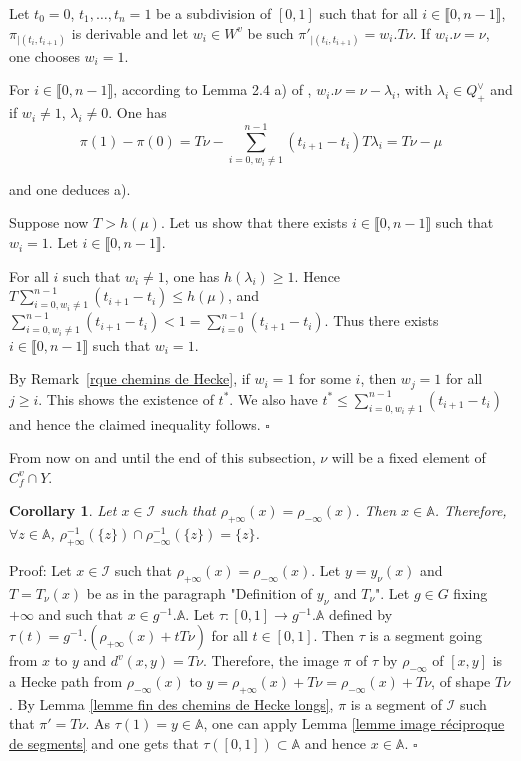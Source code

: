 \documentclass[12pt]{article}
\theoremstyle{plain}
\newtheorem{cor}[thm]{Corollary}
\theoremstyle{definition}
\newcommand{\A}{\mathbb{A}}
\begin{document}
Let $t_0=0$, $t_1, \ldots,t_n=1$ be a subdivision of $[0,1]$ such that for all $i\in \llbracket 0,n-1\rrbracket $, $\pi_{|(t_i,t_{i+1})}$ is derivable and let $w_i\in W^v$ be such $\pi'_{|(t_i,t_{i+1})}=w_i.T\nu$. If $w_i.\nu=\nu$, one chooses $w_i=1$.

For $i\in \llbracket 0,n-1\rrbracket$, according to Lemma 2.4 a) of \cite{gaussent2008kac}, $w_i.\nu =\nu -\lambda_i$, with $\lambda_i \in Q^\vee_+$ and if $w_i\neq 1$, $\lambda_i\neq 0$. One has \[\pi(1)-\pi(0)=T\nu-\sum_{i=0, w_i\neq 1}^{n-1}(t_{i+1}-t_i)T\lambda_i=T\nu -\mu\]

and one deduces a).


Suppose now $T>h(\mu)$. Let us show that there exists $i\in \llbracket 0,n-1\rrbracket$ such that $w_i=1$. Let $i\in \llbracket 0,n-1\rrbracket$. 

For all $i$ such that $w_i\neq 1$, one has $h(\lambda_i)\geq 1$. Hence $T\sum_{i=0, w_i\neq 1}^{n-1}(t_{i+1}-t_i)\leq h(\mu)$, and $\sum_{i=0, w_i\neq 1}^{n-1}(t_{i+1}-t_i)<1=\sum_{i=0}^{n-1}(t_{i+1}-t_i)$. Thus there exists $i\in \llbracket 0,n-1\rrbracket$ such that $w_i=1$.

By Remark~\ref{rque chemins de Hecke}, if $w_i=1$ for some $i$, then $w_j=1$ for all $j\geq i$. This shows the existence of $t^*$. We also have $t^*\leq \sum_{i=0, w_i\neq 1}^{n-1}(t_{i+1}-t_i)$ and hence the claimed inequality follows. $\square$




\vspace{3mm}

From now on and until the end of this subsection, $\nu$ will be a fixed element of $C_f^v\cap Y$.

\begin{cor}\label{cor points ayant meme image par les rétractions}
 Let $x\in\mathcal{I}$ such that $\rho_{+\infty}(x)=\rho_{-\infty}(x)$. Then $x\in \mathbb{A}$. Therefore, $\forall z\in \mathbb{A}$, $\rho_{+\infty}^{-1}(\{z\})\cap\rho_{-\infty}^{-1}(\{z\})=\{z\}$.
\end{cor}


Proof:  Let $x\in\mathcal{I}$ such that $\rho_{+\infty}(x)=\rho_{-\infty}(x)$. Let $y=y_\nu(x)$ and $T=T_\nu(x)$ be as in the paragraph "Definition of $y_\nu$ and $T_\nu$". Let $g\in G$ fixing $+\infty$ and such that $x\in g^{-1}.\A$. Let $\tau:[0,1]\rightarrow g^{-1}.\A$ defined by $\tau(t)=g^{-1}.(\rho_{+\infty}(x)+tT\nu)$ for all $t\in [0,1]$. Then $\tau$ is a segment going from $x$ to $y$ and $d^v(x,y)=T\nu$. Therefore, the image $\pi$ of $\tau$ by $\rho_{-\infty}$ of $[x,y]$ is a Hecke path from $\rho_{-\infty}(x)$ to $y=\rho_{+\infty}(x)+T\nu=\rho_{-\infty}(x)+T\nu$, of shape $T\nu$. By Lemma \ref{lemme fin des chemins de Hecke longs}, $\pi$ is a segment of $\mathcal{I}$ such that $\pi'=T\nu$. As $\tau(1)=y\in \A$, one can apply Lemma \ref{lemme image réciproque de segments} and one gets that $\tau([0,1])\subset \mathbb{A}$ and hence $x\in \mathbb{A}$. $\square$
\end{document}

